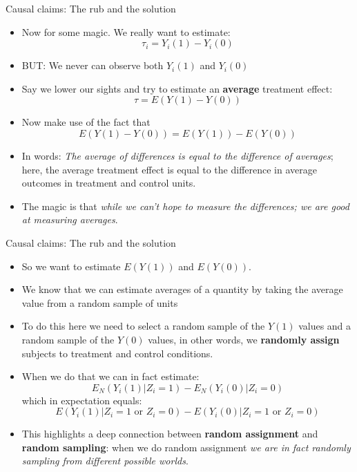 \documentclass[11pt,ignorenonframetext,]{beamer}
\providecommand{\tightlist}{%
  \setlength{\itemsep}{0pt}\setlength{\parskip}{0pt}}
\begin{document}
\begin{frame}{Causal claims: The rub and the solution}

\begin{itemize} \small
    \item  Now for some magic. We really want to estimate:  $$ \tau_i = Y_i(1) - Y_i(0)$$
    \item BUT: We never can observe both $Y_i(1)$ and $Y_i(0)$
    \item Say we lower our sights and try to estimate an \textbf{average} treatment effect:
    $$ \tau = E(Y(1)-Y(0))$$
    \item Now make use of the fact that 
$$E(Y(1)-Y(0)) = E(Y(1))-E(Y(0)) $$
\item In words: \textit{The average of differences is equal to the difference of averages}; here, the average treatment effect is equal to the difference in average outcomes in treatment and control units.
\item The magic is that \textit{while we can't hope to measure the differences; we are good at measuring averages}.   
\end{itemize}

\end{frame}

\begin{frame}{Causal claims: The rub and the solution}

\begin{itemize}
\tightlist
\item
  So we want to estimate \(E(Y(1))\) and \(E(Y(0))\).
\item
  We know that we can estimate averages of a quantity by taking the
  average value from a random sample of units
\item
  To do this here we need to select a random sample of the \(Y(1)\)
  values and a random sample of the \(Y(0)\) values, in other words, we
  \textbf{randomly assign} subjects to treatment and control conditions.
\item
  When we do that we can in fact estimate:
  \[ E_N(Y_i(1) | Z_i = 1) - E_N(Y_i(0) | Z_i = 0)\] which in
  expectation equals:
  \[ E(Y_i(1) | Z_i = 1 \text{ or } Z_i = 0) - E(Y_i(0) | Z_i = 1 \text{ or } Z_i = 0)\]
\item
  This highlights a deep connection between \textbf{random assignment}
  and \textbf{random sampling}: when we do random assignment
  \textit{we are in fact randomly sampling from different possible worlds}.
\end{itemize}

\end{frame}
\end{document}
